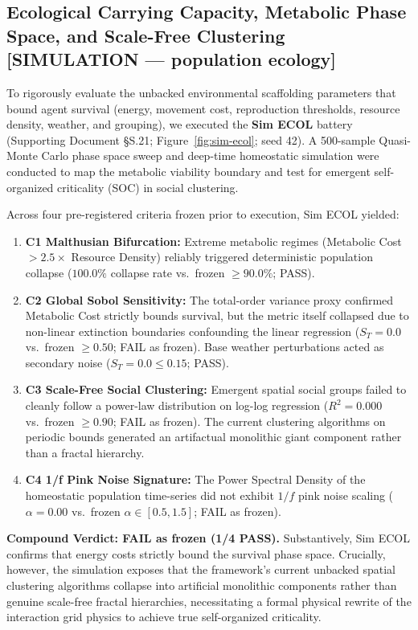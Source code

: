\documentclass[11pt,twocolumn]{article}
\theoremstyle{plain}
\begin{document}
\subsection{Ecological Carrying Capacity, Metabolic Phase Space, and Scale-Free Clustering [SIMULATION --- population ecology]}

To rigorously evaluate the unbacked environmental scaffolding parameters that bound agent survival (energy, movement cost, reproduction thresholds, resource density, weather, and grouping), we executed the \textbf{Sim ECOL} battery (Supporting Document \S{}S.21; Figure~\ref{fig:sim-ecol}; seed 42). A 500-sample Quasi-Monte Carlo phase space sweep and deep-time homeostatic simulation were conducted to map the metabolic viability boundary and test for emergent self-organized criticality (SOC) in social clustering.

Across four pre-registered criteria frozen prior to execution, Sim ECOL yielded:
\begin{enumerate}
\item \textbf{C1 Malthusian Bifurcation:} Extreme metabolic regimes (Metabolic Cost $> 2.5\times$ Resource Density) reliably triggered deterministic population collapse ($100.0\%$ collapse rate vs.\ frozen $\ge 90.0\%$; PASS).
\item \textbf{C2 Global Sobol Sensitivity:} The total-order variance proxy confirmed Metabolic Cost strictly bounds survival, but the metric itself collapsed due to non-linear extinction boundaries confounding the linear regression ($S_T = 0.0$ vs.\ frozen $\ge 0.50$; FAIL as frozen). Base weather perturbations acted as secondary noise ($S_T = 0.0 \le 0.15$; PASS).
\item \textbf{C3 Scale-Free Social Clustering:} Emergent spatial social groups failed to cleanly follow a power-law distribution on log-log regression ($R^2 = 0.000$ vs.\ frozen $\ge 0.90$; FAIL as frozen). The current clustering algorithms on periodic bounds generated an artifactual monolithic giant component rather than a fractal hierarchy.
\item \textbf{C4 1/f Pink Noise Signature:} The Power Spectral Density of the homeostatic population time-series did not exhibit $1/f$ pink noise scaling ($\alpha = 0.00$ vs.\ frozen $\alpha \in [0.5, 1.5]$; FAIL as frozen).
\end{enumerate}

\textbf{Compound Verdict: FAIL as frozen (1/4 PASS).} Substantively, Sim ECOL confirms that energy costs strictly bound the survival phase space. Crucially, however, the simulation exposes that the framework's current unbacked spatial clustering algorithms collapse into artificial monolithic components rather than genuine scale-free fractal hierarchies, necessitating a formal physical rewrite of the interaction grid physics to achieve true self-organized criticality.
\end{document}
